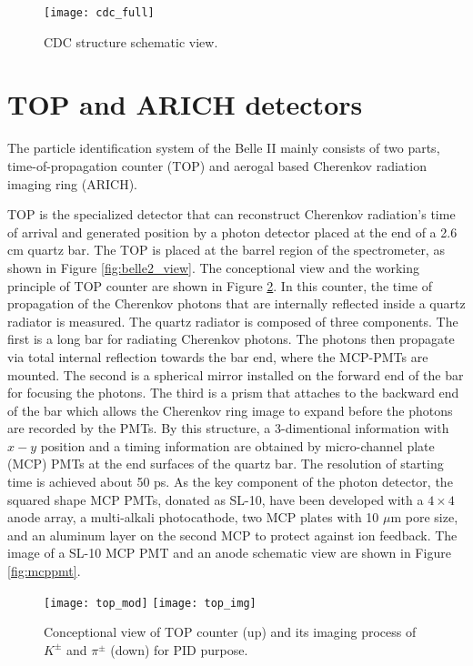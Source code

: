 \begin{figure}[H]
	\centering
	\texttt{[image: cdc\_full]}
	\caption{CDC structure schematic view\cite{Abe:2010gxa}.}
	\label{fig:cdc_full}
\end{figure}





\section{TOP and ARICH detectors}
The particle identification system of the Belle II mainly consists of two parts, time-of-propagation counter (TOP) and aerogal based Cherenkov radiation imaging ring (ARICH).

TOP is the specialized detector that can reconstruct Cherenkov radiation's time of arrival and generated position by a photon detector placed at the end of a 2.6 cm quartz bar. The TOP is placed at the barrel region of the spectrometer, as shown in Figure \ref{fig:belle2_view}. The conceptional view and the working principle of TOP counter are shown in Figure \ref{fig:top}. In this counter, the time of propagation of the Cherenkov photons that are internally
reflected inside a quartz radiator is measured. The quartz radiator is composed of three components. The first is a long bar for radiating Cherenkov photons. The photons then propagate via total internal reflection towards the bar end, where the MCP-PMTs are mounted. The second is a spherical mirror installed on the forward end of the bar for focusing the photons. The third is a prism that attaches to the backward end of the bar which allows the Cherenkov ring image to expand before the photons are recorded by the PMTs. By this structure, a 3-dimentional information with $x-y$ position and a timing information are obtained by micro-channel plate (MCP) PMTs at the end surfaces of the quartz bar.
The resolution of starting time is achieved about 50 ps\cite{Abe:2010gxa}. As the key component of the photon detector, the squared shape MCP PMTs, donated as SL-10\cite{inami2008cross}, have been developed with a $4\times 4$ anode array, a multi-alkali photocathode,
two MCP plates with 10 $\mu$m pore size, and an aluminum layer on the second MCP to protect
against ion feedback. The image of a SL-10 MCP PMT and an anode schematic view are shown in Figure \ref{fig:mcppmt}. 

\begin{figure}[htpb]
	\centering
	\texttt{[image: top\_mod]}
	\texttt{[image: top\_img]}
	\caption{Conceptional view of TOP counter (up) and its imaging process of $K^{\pm}$ and $\pi^{\pm}$ (down)\cite{Abe:2010gxa} for PID purpose.}
	\label{fig:top}
\end{figure}

